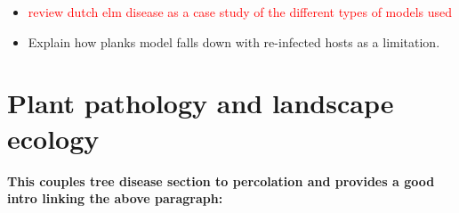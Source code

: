 \begin{itemize}
    \item  \textcolor{red}{review dutch elm disease as a case study of the different types of models used \cite{doi:10.1098/rstb.1996.0059}}
    \item Explain how planks model falls down with re-infected hosts as a limitation.
\end{itemize}
 




\section{Plant pathology and landscape ecology}
\label{chapter2:plant-ecologoy} 
\textbf{This couples tree disease section to percolation and provides a good intro linking the above paragraph:}
